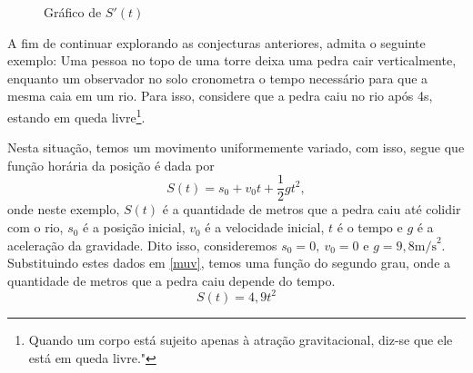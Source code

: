 \documentclass[
	12pt,				%
	openright,			%
    twoside,			%
	a4paper,			%
	chapter=TITLE,		%
	english,			%
	french,				%
	spanish,			%
	brazil				%
	]{abntex2}
\numberwithin{lema}{chapter}
\numberwithin{teorema}{chapter}
\numberwithin{definicao}{chapter}
\numberwithin{exemplo}{chapter}
\numberwithin{figure}{chapter}
\begin{document}
\begin{figure}[!h]
	\centering
	\caption{Gráfico de $S'(t)$}
	\label{grafico_constante}
\end{figure}

A fim de continuar explorando as conjecturas anteriores, admita o seguinte exemplo: Uma pessoa no topo de uma torre deixa uma pedra cair verticalmente, enquanto um observador no solo cronometra o tempo necessário para que a mesma caia em um rio. Para isso, considere que a pedra caiu no rio após 4s, estando em queda livre\footnote{Quando um corpo está sujeito apenas à atração gravitacional, diz-se que ele está em queda livre."\cite[p. 85]{fundamentos_fisica}}.

Nesta situação, temos um movimento uniformemente variado, com isso, segue que função horária da posição é dada por
\begin{equation}
	\label{muv}
	S(t) = s_0 + v_0t + \dfrac{1}{2}gt^{2},
\end{equation}
onde neste exemplo, $S(t)$ é a quantidade de metros que a pedra caiu até colidir com o rio, $s_0$ é a posição inicial, $v_0$ é a velocidade inicial, $t$ é o tempo e $g$ é a aceleração da gravidade. Dito isso, consideremos $s_0 = 0, \ v_0 = 0$ e $g = 9,8\text{m/s}^{2}$. Substituindo estes dados em \ref{muv}, temos uma função do segundo grau, onde a quantidade de metros que a pedra caiu depende do tempo.
\begin{equation}
	\label{4,9_st}
	S(t) = 4,9t^{2}
\end{equation}
\end{document}

